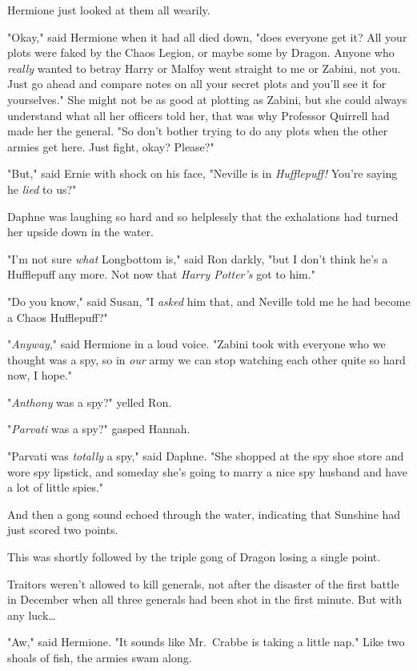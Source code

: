 Hermione just looked at them all wearily.

"Okay," said Hermione when it had all died down, "does everyone get it? All 
your plots were faked by the Chaos Legion, or maybe some by Dragon. Anyone who 
\emph{really} wanted to betray Harry or Malfoy went straight to me or Zabini, 
not you. Just go ahead and compare notes on all your secret plots and you'll 
see it for yourselves." She might not be as good at plotting as Zabini, but she 
could always understand what all her officers told her, that was why Professor 
Quirrell had made her the general. "So don't bother trying to do any plots when 
the other armies get here. Just fight, okay? Please?"

"But," said Ernie with shock on his face, "Neville is in \emph{Hufflepuff!} 
You're saying he \emph{lied} to us?"

Daphne was laughing so hard and so helplessly that the exhalations had turned 
her upside down in the water.

"I'm not sure \emph{what} Longbottom is," said Ron darkly, "but I don't think 
he's a Hufflepuff any more. Not now that \emph{Harry Potter's} got to him."

"Do you know," said Susan, "I \emph{asked} him that, and Neville told me he had 
become a Chaos Hufflepuff?"

"\emph{Anyway}," said Hermione in a loud voice. "Zabini took with everyone who 
we thought was a spy, so in \emph{our} army we can stop watching each other 
quite so hard now, I hope."

"\emph{Anthony} was a spy?" yelled Ron.

"\emph{Parvati} was a spy?" gasped Hannah.

"Parvati was \emph{totally} a spy," said Daphne. "She shopped at the spy shoe 
store and wore spy lipstick, and someday she's going to marry a nice spy 
husband and have a lot of little spies."

And then a gong sound echoed through the water, indicating that Sunshine had 
just scored two points.

This was shortly followed by the triple gong of Dragon losing a single point.

Traitors weren't allowed to kill generals, not after the disaster of the first 
battle in December when all three generals had been shot in the first minute. 
But with any luck{\ldots}

"Aw," said Hermione. "It sounds like Mr.~Crabbe is taking a little nap."
\sbreak
Like two shoals of fish, the armies swam along.

